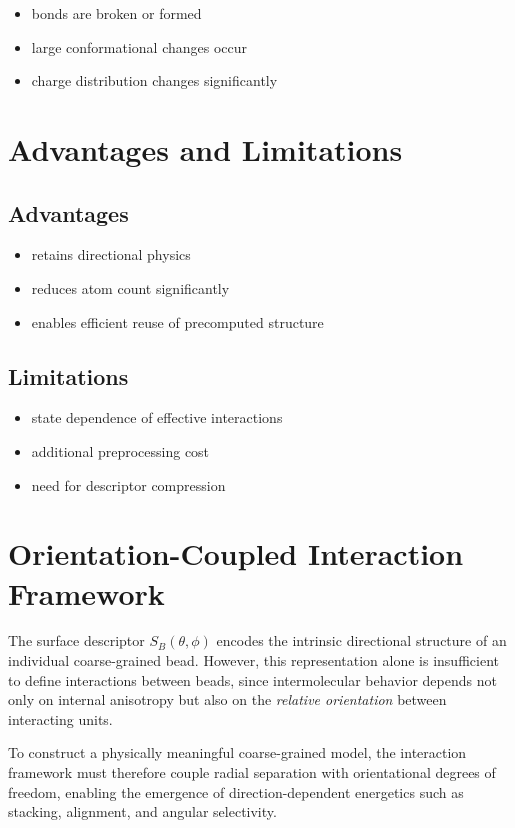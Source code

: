 \documentclass[11pt]{article}
\begin{document}
\begin{itemize}
    \item bonds are broken or formed
    \item large conformational changes occur
    \item charge distribution changes significantly
\end{itemize}

\section{Advantages and Limitations}

\subsection{Advantages}
\begin{itemize}
    \item retains directional physics
    \item reduces atom count significantly
    \item enables efficient reuse of precomputed structure
\end{itemize}

\subsection{Limitations}
\begin{itemize}
    \item state dependence of effective interactions
    \item additional preprocessing cost
    \item need for descriptor compression
\end{itemize}

\section{Orientation-Coupled Interaction Framework}

The surface descriptor $S_B(\theta,\phi)$ encodes the intrinsic directional structure of an individual coarse-grained bead. However, this representation alone is insufficient to define interactions between beads, since intermolecular behavior depends not only on internal anisotropy but also on the \emph{relative orientation} between interacting units.

To construct a physically meaningful coarse-grained model, the interaction framework must therefore couple radial separation with orientational degrees of freedom, enabling the emergence of direction-dependent energetics such as stacking, alignment, and angular selectivity.
\end{document}
